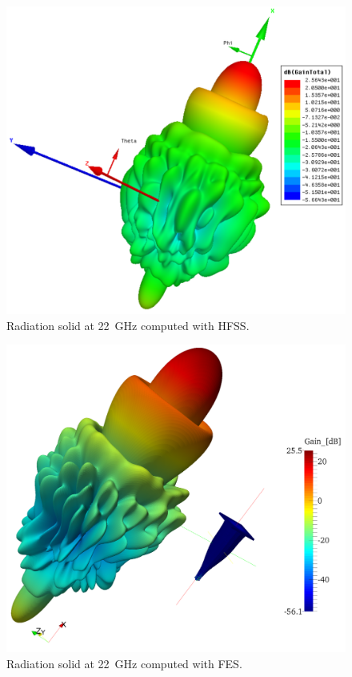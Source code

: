 \begin{figure}[h!]
\centering
\includegraphics[width=13.4cm]{CircHornRadHFSS}
\caption{Radiation solid at 22~GHz computed with HFSS.}
\label{fig:CircHornRadHFSS}
\end{figure}

\begin{figure}[h!]
\centering
\includegraphics[width=12.4cm]{CircHornRad}
\caption{Radiation solid at 22~GHz computed with FES.}
\label{fig:CircHornRad}
\end{figure}

